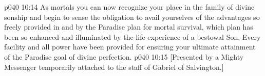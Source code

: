 \vs p040 10:14 As mortals you can now recognize your place in the family of divine sonship and begin to sense the obligation to avail yourselves of the advantages so freely provided in and by the Paradise plan for mortal survival, which plan has been so enhanced and illuminated by the life experience of a bestowal Son. Every facility and all power have been provided for ensuring your ultimate attainment of the Paradise goal of divine perfection.
\vsetoff
\vs p040 10:15 [Presented by a Mighty Messenger temporarily attached to the staff of Gabriel of Salvington.]
